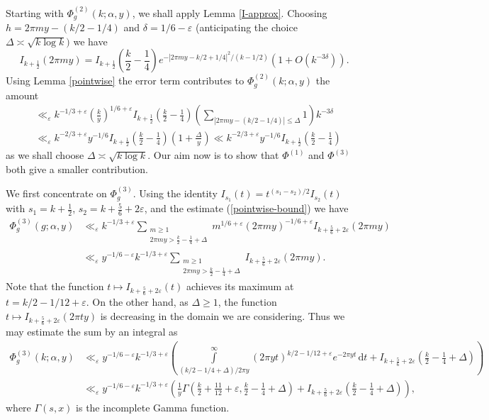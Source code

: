 \documentclass[a4paper,10pt,twoside]{amsart}
\theoremstyle{definition}
\numberwithin{equation}{section}
\newcommand\eps{\varepsilon}
\renewcommand\:{\colon}
\begin{document}
Starting with $\Phi_g^{(2)}(k;\alpha,y)$, we shall apply Lemma \ref{I-approx}. Choosing $h=2\pi my-(k/2-1/4)$ and $\delta=1/6-\varepsilon$ (anticipating the choice $\Delta\asymp \sqrt{k\log k})$ we have
\[ 
I_{k+\frac12}(2\pi my)=I_{k+\frac12}\left(\frac k2-\frac14\right)e^{-|2\pi my-k/2+1/4|^2/(k-1/2)}\left(1+O\left(k^{-3\delta}\right)\right).\]
Using Lemma \ref{pointwise} the error term contributes to $\Phi_g^{(2)}(k;\alpha,y)$ the amount
\begin{align*}
&\ll_\eps k^{-1/3+\varepsilon}\left(\frac ky\right)^{1/6+\varepsilon}I_{k+\frac12}\left(\frac k2-\frac14\right)\left(\sum_{|2\pi my-(k/2-1/4)|\leq\Delta}1\right)k^{-3\delta}\\
&\ll_\eps k^{-2/3+\varepsilon}y^{-1/6}I_{k+\frac12}\left(\frac k2-\frac14\right)\left(1+\frac\Delta y\right)\ll k^{-2/3+\varepsilon}y^{-1/6}I_{k+\frac12}\left(\frac k2-\frac14\right)
\end{align*}
as we shall choose $\Delta\asymp\sqrt{k\log k}$. Our aim now is to show that $\Phi^{(1)}$ and $\Phi^{(3)}$ both give a smaller contribution.

We first concentrate on $\Phi_g^{(3)}$. Using the identity $I_{s_1}(t)=t^{(s_1-s_2)/2}I_{s_2}(t)$ with $s_1=k+\frac12$, $s_2=k+\frac56+2\eps$, and the estimate (\ref{pointwise-bound}) we have 
\begin{align*}
\Phi_g^{(3)}(g;\alpha,y)&\ll_\eps k^{-1/3+\varepsilon}\sum_{\substack{m\geq 1\\
2\pi my>\frac k2-\frac14+\Delta}}m^{1/6+\varepsilon}(2\pi my)^{-1/6+\varepsilon}I_{k+\frac56+2\varepsilon}(2\pi my)\\
&\ll_\eps y^{-1/6-\varepsilon}k^{-1/3+\varepsilon}\sum_{\substack{m\geq 1\\
2\pi my>\frac k2-\frac14+\Delta}}I_{k+\frac56+2\varepsilon}(2\pi my). 
\end{align*}
Note that the function $t\mapsto I_{k+\frac56+2\varepsilon}(t)$ achieves its maximum at $t=k/2-1/12+\varepsilon$. On the other hand, as $\Delta\geq 1$, the function $t\mapsto I_{k+\frac 56+2\varepsilon}(2\pi ty)$ is decreasing in the domain we are considering. Thus we may estimate the sum by an integral as
\begin{align*}
\Phi_g^{(3)}(k;\alpha,y)&\ll_\eps y^{-1/6-\varepsilon}k^{-1/3+\varepsilon}\left(\int\limits_{(k/2-1/4+\Delta)/2\pi y}^\infty (2\pi yt)^{k/2-1/12+\varepsilon}e^{-2\pi yt}\,\mathrm d t+I_{k+\frac56+2\varepsilon}\left(\frac k2-\frac14+\Delta\right) \right)\\
&\ll_\eps y^{-1/6-\varepsilon}k^{-1/3+\varepsilon}\left(\frac 1y\Gamma\left(\frac k2+\frac{11}{12}+\varepsilon,\frac k2-\frac14+\Delta\right)+I_{k+\frac56+2\varepsilon}\left(\frac k2-\frac14+\Delta\right)\right),
\end{align*}
where $\Gamma(s,x)$ is the incomplete Gamma function.
\end{document}

